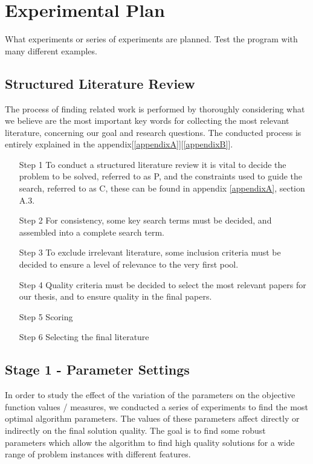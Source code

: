 \section{Experimental Plan}

What experiments or series of experiments are planned. Test the program with many different examples.

\subsection{Structured Literature Review}
The process of finding related work is performed by thoroughly considering what we believe are the most important key words for collecting the most relevant literature, concerning our goal and research questions. The conducted process is entirely explained in the appendix[\ref{appendixA}][\ref{appendixB}].

\begin{itemize}
\item[Step 1] To conduct a structured literature review it is vital to decide the problem to be solved, referred to as P, and the constraints used to guide the search, referred to as C, these can be found in appendix \ref{appendixA}, section A.3. 
\item[Step 2] For consistency, some key search terms must be decided, and assembled into a complete search term. 
\item[Step 3] To exclude irrelevant literature, some inclusion criteria must be decided to ensure a level of relevance to the very first pool. 
\item[Step 4] Quality criteria must be decided to select the most relevant papers for our thesis, and to ensure quality in the final papers. 
\item[Step 5] Scoring
\item[Step 6] Selecting the final literature
\end{itemize}


\subsection{Stage 1 - Parameter Settings}

In order to study the effect of the variation of the parameters on the objective function values / measures, we conducted a series of experiments to find the most optimal algorithm parameters. The values of these parameters affect directly or indirectly on the final solution quality. The goal is to find some robust parameters which allow the algorithm to find high quality solutions for a wide range of problem instances with different features. 

